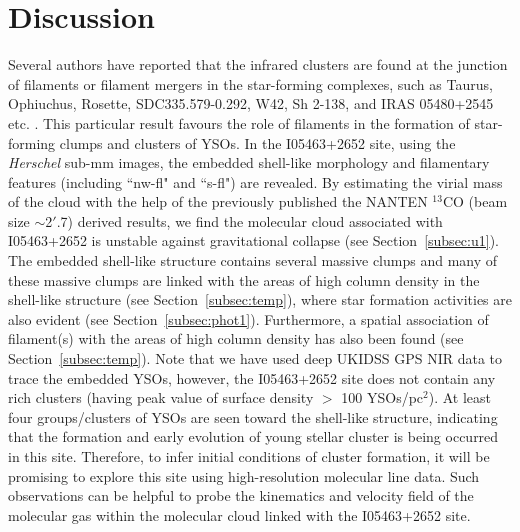 \documentclass[iop]{emulateapj}
\begin{document}
\section{Discussion}
\label{sec:disc}
%
Several authors have reported that the infrared clusters are found at the junction of filaments or filament mergers 
in the star-forming complexes, such as Taurus, Ophiuchus, Rosette, SDC335.579-0.292, W42, Sh 2-138, and IRAS 05480+2545 etc. \citep[e.g.][]{myers09,schneider12,peretto13,dewangan15,baug15,dewangan17b}.  
This particular result favours the role of filaments in the formation of star-forming clumps and clusters of YSOs. 
In the I05463+2652 site, using the {\it Herschel} sub-mm images, the embedded shell-like morphology and filamentary features (including ``nw-fl" and ``s-fl") are revealed.
By estimating the virial mass of the cloud with the help of the previously published the NANTEN $^{13}$CO (beam size $\sim$2$'$.7) derived results, we find the molecular cloud associated with 
I05463+2652 is unstable against gravitational collapse (see Section~\ref{subsec:u1}). 
The embedded shell-like structure contains several massive clumps and many of these massive clumps are 
linked with the areas of high column density in the shell-like structure (see Section~\ref{subsec:temp}), 
where star formation activities are also evident (see Section~\ref{subsec:phot1}).
Furthermore, a spatial association of filament(s) with the areas of high column density has also been found (see Section~\ref{subsec:temp}). 
Note that we have used deep UKIDSS GPS NIR data to trace the embedded YSOs, however, the I05463+2652 site does 
not contain any rich clusters (having peak value of surface density $>$ 100 YSOs/pc$^{2}$). 
At least four groups/clusters of YSOs are seen toward the shell-like structure, indicating that the formation and early evolution of 
young stellar cluster is being occurred in this site. 
Therefore, to infer initial conditions of cluster formation, it will be promising to explore this site using high-resolution molecular line data. Such observations can be helpful to probe the kinematics and 
velocity field of the molecular gas within the molecular cloud linked with the I05463+2652 site. 
\end{document}
